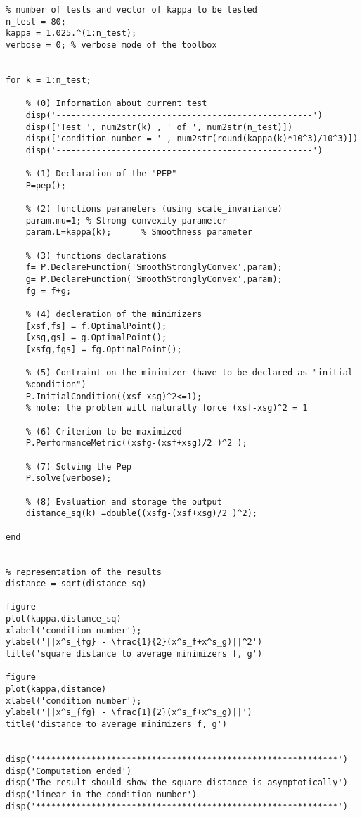 \documentclass[11pt,a4paper]{article}
\begin{document}
\begin{lstlisting}
% number of tests and vector of kappa to be tested
n_test = 80;
kappa = 1.025.^(1:n_test);
verbose = 0; % verbose mode of the toolbox


for k = 1:n_test;

	% (0) Information about current test    
	disp('---------------------------------------------------')
	disp(['Test ', num2str(k) , ' of ', num2str(n_test)])
	disp(['condition number = ' , num2str(round(kappa(k)*10^3)/10^3)])
	disp('---------------------------------------------------')

	% (1) Declaration of the "PEP"
	P=pep();

	% (2) functions parameters (using scale_invariance)
	param.mu=1;	% Strong convexity parameter
	param.L=kappa(k);      % Smoothness parameter

	% (3) functions declarations
	f= P.DeclareFunction('SmoothStronglyConvex',param);
	g= P.DeclareFunction('SmoothStronglyConvex',param);
	fg = f+g;

	% (4) decleration of the minimizers
	[xsf,fs] = f.OptimalPoint();
	[xsg,gs] = g.OptimalPoint();
	[xsfg,fgs] = fg.OptimalPoint();

	% (5) Contraint on the minimizer (have to be declared as "initial
	%condition")
	P.InitialCondition((xsf-xsg)^2<=1);
	% note: the problem will naturally force (xsf-xsg)^2 = 1

	% (6) Criterion to be maximized
	P.PerformanceMetric((xsfg-(xsf+xsg)/2 )^2 ); 

	% (7) Solving the Pep
	P.solve(verbose);

	% (8) Evaluation and storage the output
	distance_sq(k) =double((xsfg-(xsf+xsg)/2 )^2); 

end


% representation of the results
distance = sqrt(distance_sq)

figure
plot(kappa,distance_sq)
xlabel('condition number');
ylabel('||x^s_{fg} - \frac{1}{2}(x^s_f+x^s_g)||^2')
title('square distance to average minimizers f, g')

figure
plot(kappa,distance)
xlabel('condition number');
ylabel('||x^s_{fg} - \frac{1}{2}(x^s_f+x^s_g)||')
title('distance to average minimizers f, g')


disp('************************************************************')
disp('Computation ended')
disp('The result should show the square distance is asymptotically')
disp('linear in the condition number')
disp('************************************************************')
\end{lstlisting}
\clearpage

{}
\end{document}
